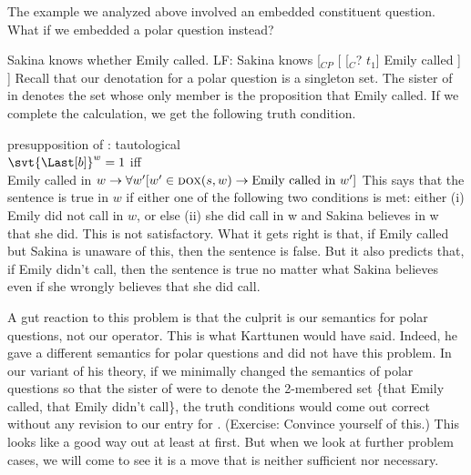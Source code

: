 The example we analyzed above involved an embedded constituent question. What if
we embedded a polar question instead?

\pex
\a Sakina knows whether Emily called.
\a LF: Sakina knows [$_{CP}$ [ [$_{C}$? $t_{1}$] Emily called ] ]
\xe
%
Recall that our denotation for a polar question is a singleton set. The sister
of \ans in \Last[b] denotes the set whose only member is the proposition that
Emily called. If we complete the calculation, we get the following truth
condition.

\ex presupposition of \Last[b]: tautological\\
$\svt{\Last[b]}^{w} = 1$ iff\\
Emily called in
$w \rightarrow \forall w' [w'\in\textsc{dox}(s,w) \rightarrow \text{Emily called
  in}\ w']$
\xe
%
This says that the sentence \LLast[a] is true in $w$ if either one of the
following two conditions is met: either (i) Emily did not call in $w$, or else
(ii) she did call in w and Sakina believes in w that she did. This is not
satisfactory. What it gets right is that, if Emily called but Sakina is unaware
of this, then the sentence is false. But it also predicts that, if Emily didn't
call, then the sentence is true no matter what Sakina believes \dash even if she
wrongly believes that she did call.

A gut reaction to this problem is that the culprit is our semantics for polar
questions, not our \ans operator. This is what Karttunen would have said.
Indeed, he gave a different semantics for polar questions and did not have this
problem. %
%
In our variant of his theory, if we minimally changed the semantics of polar
questions so that the sister of \ans were to denote the 2-membered set \{that
Emily called, that Emily didn't call\}, the truth conditions would come out
correct without any revision to our entry for \ans. (Exercise: Convince yourself
of this.) This looks like a good way out \dash at least at first. But when we
look at further problem cases, we will come to see it is a move that is neither
sufficient nor necessary.

